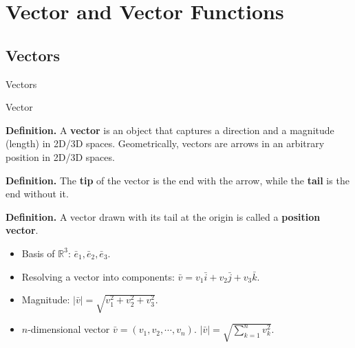 \documentclass[aspectratio=169, UTF8]{ctexbeamer}
\begin{document}
\section{Vector and Vector Functions}
    \subsection{Vectors} 

    \begin{frame}[label=4]{Vectors}
        \begin{block}{Vector}
            \par \textbf{Definition.} A \textbf{vector} is an object that captures a direction and a magnitude (length) in 2D/3D spaces. Geometrically, vectors are arrows in an arbitrary position in 2D/3D spaces.

            \par \textbf{Definition.} The \textbf{tip} of the vector is the end with the arrow, while the \textbf{tail} is the end without it.

            \par \textbf{Definition.} A vector drawn with its tail at the origin is called a \textbf{position vector}.
        \end{block}

        \begin{itemize}
            \item Basis of $\mathbb{R}^3$: $\bar{e}_1,\bar{e}_2,\bar{e}_3$.
            \item Resolving a vector into components: $\bar{v} = v_1 \bar{i} + v_2 \bar{j} + v_3 \bar{k}$.
            \item Magnitude: $\left| \bar{v} \right| = \sqrt{v_1^2 + v_2^2 + v_3^2}$.
            \item $n$-dimensional vector $\bar{v} = (v_1,v_2,\cdots,v_n)$. $\left| \bar{v} \right| = \sqrt{\sum\limits_{k=1}^{n}v_k^2}$.
        \end{itemize}
    \end{frame}
\end{document}
